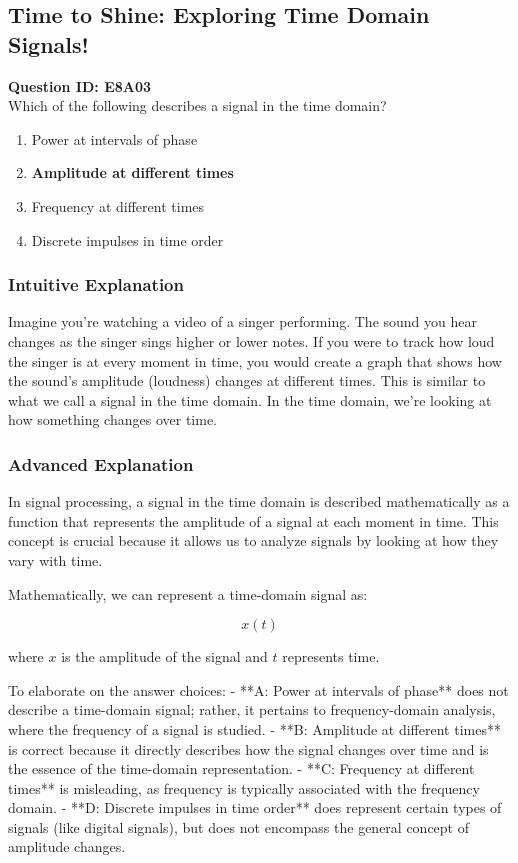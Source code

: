 \subsection{Time to Shine: Exploring Time Domain Signals!}

\begin{tcolorbox}
\textbf{Question ID: E8A03} \\
Which of the following describes a signal in the time domain?
\begin{enumerate}[label=\Alph*.]
    \item Power at intervals of phase
    \item \textbf{Amplitude at different times}
    \item Frequency at different times
    \item Discrete impulses in time order
\end{enumerate}
\end{tcolorbox}

\subsubsection{Intuitive Explanation}
Imagine you're watching a video of a singer performing. The sound you hear changes as the singer sings higher or lower notes. If you were to track how loud the singer is at every moment in time, you would create a graph that shows how the sound's amplitude (loudness) changes at different times. This is similar to what we call a signal in the time domain. In the time domain, we're looking at how something changes over time.

\subsubsection{Advanced Explanation}
In signal processing, a signal in the time domain is described mathematically as a function that represents the amplitude of a signal at each moment in time. This concept is crucial because it allows us to analyze signals by looking at how they vary with time.

Mathematically, we can represent a time-domain signal as:

\[
x(t)
\]

where \( x \) is the amplitude of the signal and \( t \) represents time. 

To elaborate on the answer choices:
- **A: Power at intervals of phase** does not describe a time-domain signal; rather, it pertains to frequency-domain analysis, where the frequency of a signal is studied.
- **B: Amplitude at different times** is correct because it directly describes how the signal changes over time and is the essence of the time-domain representation.
- **C: Frequency at different times** is misleading, as frequency is typically associated with the frequency domain.
- **D: Discrete impulses in time order** does represent certain types of signals (like digital signals), but does not encompass the general concept of amplitude changes.

